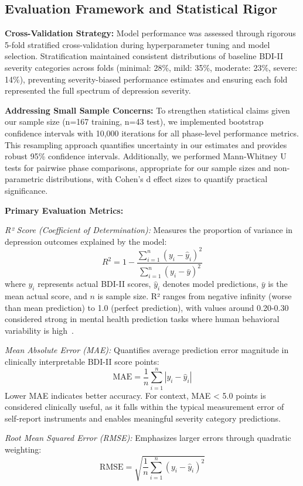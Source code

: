 \documentclass[conference]{IEEEtran}
\begin{document}
\subsection{Evaluation Framework and Statistical Rigor}

\textbf{Cross-Validation Strategy:} Model performance was assessed through rigorous 5-fold stratified cross-validation during hyperparameter tuning and model selection. Stratification maintained consistent distributions of baseline BDI-II severity categories across folds (minimal: 28\%, mild: 35\%, moderate: 23\%, severe: 14\%), preventing severity-biased performance estimates and ensuring each fold represented the full spectrum of depression severity.

\textbf{Addressing Small Sample Concerns:} To strengthen statistical claims given our sample size (n=167 training, n=43 test), we implemented bootstrap confidence intervals with 10,000 iterations for all phase-level performance metrics. This resampling approach quantifies uncertainty in our estimates and provides robust 95\% confidence intervals. Additionally, we performed Mann-Whitney U tests for pairwise phase comparisons, appropriate for our sample sizes and non-parametric distributions, with Cohen's d effect sizes to quantify practical significance.

\textbf{Primary Evaluation Metrics:}

\textit{R² Score (Coefficient of Determination):} Measures the proportion of variance in depression outcomes explained by the model:
\[
R^2 = 1 - \frac{\sum_{i=1}^{n} (y_i - \hat{y}_i)^2}{\sum_{i=1}^{n} (y_i - \bar{y})^2}
\]
where $y_i$ represents actual BDI-II scores, $\hat{y}_i$ denotes model predictions, $\bar{y}$ is the mean actual score, and $n$ is sample size. R² ranges from negative infinity (worse than mean prediction) to 1.0 (perfect prediction), with values around 0.20-0.30 considered strong in mental health prediction tasks where human behavioral variability is high~\cite{b6,b7,b8}.

\textit{Mean Absolute Error (MAE):} Quantifies average prediction error magnitude in clinically interpretable BDI-II score points:
\[
\text{MAE} = \frac{1}{n} \sum_{i=1}^{n} |y_i - \hat{y}_i|
\]
Lower MAE indicates better accuracy. For context, MAE < 5.0 points is considered clinically useful, as it falls within the typical measurement error of self-report instruments and enables meaningful severity category predictions.

\textit{Root Mean Squared Error (RMSE):} Emphasizes larger errors through quadratic weighting:
\[
\text{RMSE} = \sqrt{\frac{1}{n} \sum_{i=1}^{n} (y_i - \hat{y}_i)^2}
\]
\end{document}
